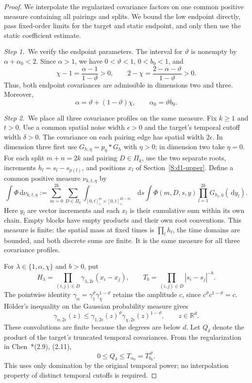 \documentclass[12pt,oneside,openany]{book}
\numberwithin{equation}{section}
\theoremstyle{nogostyle}
\theoremstyle{definition}
\newcommand{\R}{\mathbb{R}}
\newcommand{\ud}{\,\mathrm{d}}
\begin{document}
\begin{proof}
  We interpolate the regularized covariance factors on one common positive
  measure containing all pairings and splits. We bound the low endpoint
  directly, pass fixed-order limits for the target and static endpoint, and
  only then use the static coefficient estimate.


  \medskip
  \noindent\textit{Step 1.~}We verify the endpoint parameters.
  The interval for $\vartheta$ is nonempty by $\alpha+\alpha_0 < 2$. Since
  $\alpha > 1$, we have $0 < \vartheta < 1$, $0 < b_0 < 1$, and
  \[
    \chi-1=\frac{\alpha-1}{1-\vartheta}>0,\qquad
    2-\chi=\frac{2-\alpha-\vartheta}{1-\vartheta}>0.
  \]
  Thus, both endpoint covariances are admissible in dimensions two and three.
  Moreover,
  \begin{equation}\label{E:static-holder-affine}
    \alpha=\vartheta+(1-\vartheta)\chi,
    \qquad \alpha_0=\vartheta b_0.
  \end{equation}


  \medskip
  \noindent\textit{Step 2.~}We place all three covariance profiles on the same
  measure.
  Fix $k \ge 1$ and $t > 0$. Use a common spatial noise width $\epsilon > 0$ and
  the target's temporal cutoff width $\delta > 0$. The covariance on each
  pairing edge has spatial width $2\epsilon$. In dimension three first use
  $G_{h,\eta} = p_\eta*G_h$ with $\eta > 0$; in dimension two take $\eta = 0$.
  For each split $m+n = 2k$ and pairing $D \in \Pi_k$, use the two separate
  roots, increments $h_l = s_l-s_{p(l)}$, and positions $x_l$ of
  Section~\ref{S:d1-upper}. Define a common positive measure $\nu_{k,t,\eta}$ by
  \[
    \int\Phi\ud\nu_{k,t,\eta}
    :=\sum_{m=0}^{2k}\sum_{D\in\Pi_k}
    \int_{[0,t]^m_<\times[0,t]^{2k-m}_<}\ud s
    \int\Phi(m,D,s,y)\prod_{l=1}^{2k}G_{h_l,\eta}(\ud y_l).
  \]
  Here $y_l$ are vector increments and each $x_l$ is their cumulative sum within
  its own chain. Empty blocks have empty products and their own root
  conventions. This measure is finite: the spatial mass at fixed times is
  $\prod_lh_l$, the time domains are bounded, and both discrete sums are finite.
  It is the same measure for all three covariance profiles.

  For $\lambda \in \{1,\alpha,\chi\}$ and $b > 0$, put
  \[
    H_\lambda=\prod_{(i,j)\in D}
    \gamma_{\lambda,2\epsilon}(x_i-x_j),\qquad
    T_b=\prod_{(i,j)\in D}|s_i-s_j|^{-b}.
  \]
  The pointwise identity $\gamma_\alpha =
  \gamma_1^{\vartheta}\gamma_\chi^{1-\vartheta}$ retains the amplitude $c$,
  since $c^\vartheta c^{1-\vartheta} = c$. H\"older's inequality on the Gaussian
  probability measure gives
  \[
    \gamma_{\alpha,2\epsilon}(z)
    \le\gamma_{1,2\epsilon}(z)^\vartheta
    \gamma_{\chi,2\epsilon}(z)^{1-\vartheta},
    \qquad z\in\R^d.
  \]
  These convolutions are finite because the degrees are below $d$. Let
  $Q_\delta$ denote the product of the target's truncated temporal covariances.
  From the regularization in Chen~\cite{chen:author2026:time-dependency}*{(2.9),
  (2.11)},
  \[
    0\le Q_\delta\le T_{\alpha_0}=T_{b_0}^{\,\vartheta}.
  \]
  This uses only domination by the original temporal power; no interpolation
  property of distinct temporal cutoffs is required.


\end{proof}
\end{document}
